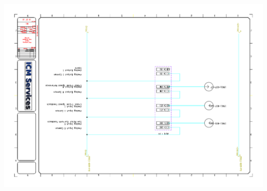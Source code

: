 \begin{center}
	\includegraphics[width=7.5in,angle=90]{../DRAWINGS/19011-011.pdf}
	\label{schem:011} %
\end{center}
